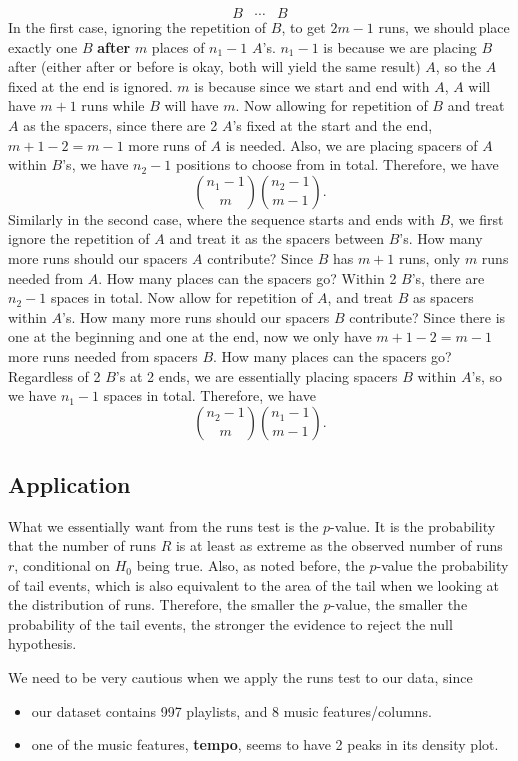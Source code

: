 \documentclass[12pt]{article}
\theoremstyle{plain}
\theoremstyle{definition}
\theoremstyle{remark}
\begin{document}
\begin{itemize}
    $$B\;\;\; \cdots \;\;\; B$$ In the first case, ignoring the repetition of $B$, to get $2m-1$ runs, we should place exactly one $B$ \textbf{after} $m$ places of $n_1-1$ $A$'s. $n_1-1$ is because we are placing $B$ after (either after or before is okay, both will yield the same result) $A$, so the $A$ fixed at the end is ignored. $m$ is because since we start and end with $A$, $A$ will have $m+1$ runs while $B$ will have $m$. Now allowing for repetition of $B$ and treat $A$ as the spacers, since there are 2 $A$'s fixed at the start and the end, $m+1-2=m-1$ more runs of $A$ is needed. Also, we are placing spacers of $A$ within $B$'s, we have $n_2-1$ positions to choose from in total. Therefore, we have $$\binom{n_1-1}{m}\binom{n_2-1}{m-1}.$$ Similarly in the second case, where the sequence starts and ends with $B$, we first ignore the repetition of $A$ and treat it as the spacers between $B$'s. How many more runs should our spacers $A$ contribute? Since $B$ has $m+1$ runs, only $m$ runs needed from $A$. How many places can the spacers go? Within 2 $B$'s, there are $n_2-1$ spaces in total. Now allow for repetition of $A$, and treat $B$ as spacers within $A$'s. How many more runs should our spacers $B$ contribute? Since there is one at the beginning and one at the end, now we only have $m+1-2=m-1$ more runs needed from spacers $B$. How many places can the spacers go? Regardless of 2 $B$'s at 2 ends, we are essentially placing spacers $B$ within $A$'s, so we have $n_1-1$ spaces in total. Therefore, we have $$\binom{n_2-1}{m} \binom{n_1-1}{m-1}.$$
\end{itemize}


\newpage
\subsection{Application}
What we essentially want from the runs test is the $p$-value. It is the probability that the number of runs $R$ is at least as extreme as the observed number of runs $r$, conditional on $H_0$ being true. Also, as noted before, the $p$-value the probability of tail events, which is also equivalent to the area of the tail when we looking at the distribution of runs. Therefore, the smaller the $p$-value, the smaller the probability of the tail events, the stronger the evidence to reject the null hypothesis.

We need to be very cautious when we apply the runs test to our data, since
\begin{itemize}
    \item our dataset contains 997 playlists, and 8 music features/columns. 
    \item one of the music features, \textbf{tempo}, seems to have 2 peaks in its density plot.
\end{itemize}
\end{document}
